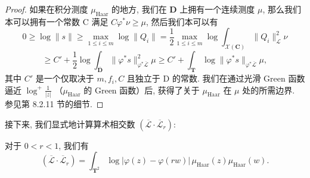 \begin{proof}
如果在积分测度 \(\mu_{\text{Haar}}\) 的地方, 我们在 \(\mathbf{D}\) 上拥有一个连续测度 \(\mu\), 
那么我们本可以拥有一个常数 C 满足 \(C\varphi^*\nu \geq \mu\), 
然后我们本可以有
\[ 0 \ge \log \|s\| \ge \max_{1 \le i \le m} \log \|Q_i\| = \frac{1}{2} \max_{1 \le i \le m} \log \int_{\mathcal{X}(\mathbf{C})} \|Q_i\|_{\mathcal{L}}^2 \nu \]
\[ \ge C' + \frac{1}{2} \log \int_{\overline{\mathbf{D}}} \|\varphi^* s\|_{\varphi^* \overline{\mathcal{L}}}^2 \mu \ge C' + \int_{\mathbf{T}} \log \|\varphi^* s\|_{\varphi^* \overline{\mathcal{L}}} \mu, \]
其中 \(C'\) 是一个仅取决于 \(m, f_i, C\) 且独立于 D 的常数. 
我们在通过光滑 Green 函数逼近 \(\log^+ \frac{1}{|z|}\) （\(\mu_{\text{Haar}}\) 的 Green 函数）后, 
获得了关于 \(\mu_{\text{Haar}}\) 在 \(\mu\) 处的所需边界. 参见第 8.2.11 节的细节.
\end{proof}

接下来, 我们显式地计算算术相交数 \((\overline{\mathcal{L}} \cdot \overline{\mathcal{L}}_r)\):

\begin{lemma}\label{lem:7.4.5}
对于 \(0 < r < 1\), 我们有
\[ (\overline{\mathcal{L}} \cdot \overline{\mathcal{L}}_r) = \int_{\mathbf{T}^2} \log |\varphi(z) - \varphi(rw)| \, \mu_{\text{Haar}}(z) \mu_{\text{Haar}}(w). \]
\end{lemma}

